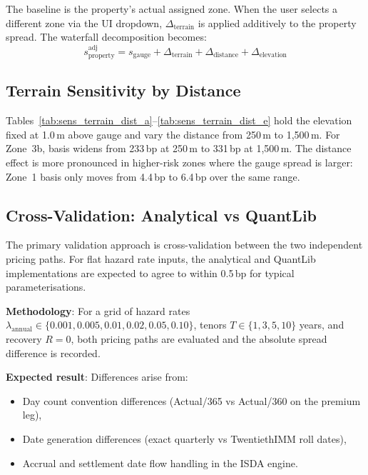 \documentclass[11pt,a4paper]{article}
\begin{document}
The baseline is the property's actual assigned zone. When the user selects a different
zone via the UI dropdown, $\Delta_{\text{terrain}}$ is applied additively to the
property spread. The waterfall decomposition becomes:
\begin{equation}
    s_{\text{property}}^{\text{adj}} = s_{\text{gauge}} + \Delta_{\text{terrain}}
    + \Delta_{\text{distance}} + \Delta_{\text{elevation}}
\end{equation}

\subsection{Terrain Sensitivity by Distance}

Tables~\ref{tab:sens_terrain_dist_a}--\ref{tab:sens_terrain_dist_e} hold the elevation
fixed at 1.0\,m above gauge and vary the distance from 250\,m to 1{,}500\,m. For
Zone~3b, basis widens from 233\,bp at 250\,m to 331\,bp at 1{,}500\,m. The distance
effect is more pronounced in higher-risk zones where the gauge spread is larger: Zone~1
basis only moves from 4.4\,bp to 6.4\,bp over the same range.


\mkmvalidation

\subsection{Cross-Validation: Analytical vs QuantLib}

The primary validation approach is cross-validation between the two independent pricing
paths. For flat hazard rate inputs, the analytical and QuantLib implementations are
expected to agree to within 0.5\,bp for typical parameterisations.

\textbf{Methodology}: For a grid of hazard rates $\lambda_{\text{annual}} \in \{0.001,
0.005, 0.01, 0.02, 0.05, 0.10\}$, tenors $T \in \{1, 3, 5, 10\}$ years, and recovery
$R = 0$, both pricing paths are evaluated and the
absolute spread difference is recorded.

\textbf{Expected result}: Differences arise from:
\begin{itemize}[nosep]
    \item Day count convention differences (Actual/365 vs Actual/360 on the premium leg),
    \item Date generation differences (exact quarterly vs TwentiethIMM roll dates),
    \item Accrual and settlement date flow handling in the ISDA engine.
\end{itemize}
\end{document}
